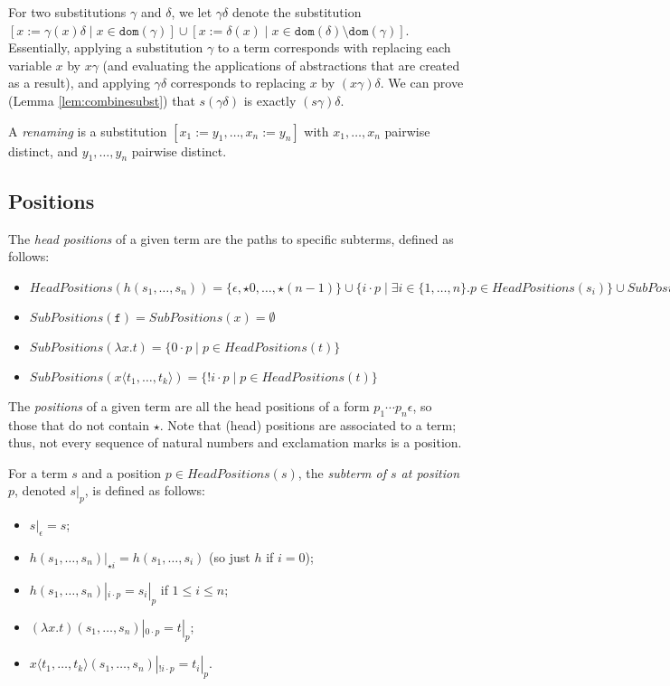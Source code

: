 \documentclass{lmcs}
\theoremstyle{theorem}\newtheorem{theorem}{Theorem}
\theoremstyle{theorem}\newtheorem{lemma}[theorem]{Lemma}
\theoremstyle{theorem}\newtheorem{corollary}[theorem]{Corollary}
\theoremstyle{definition}\newtheorem{definition}[theorem]{Definition}
\theoremstyle{definition}\newtheorem{example}[theorem]{Example}
\newcommand{\SubPositions}{\mathit{SubPositions}}
\newcommand{\HeadPositions}{\mathit{HeadPositions}}
\newcommand{\domain}{\mathtt{dom}}
\newcommand{\identifier}[1]{\mathtt{#1}}
\newcommand{\afun}{\identifier{f}}
\newcommand{\avar}{x}
\newcommand{\abs}[2]{\lambda #1.#2}
\newcommand{\meta}[2]{#1\langle#2\rangle}
\begin{document}
For two substitutions $\gamma$ and $\delta$, we let $\gamma\delta$ denote the substitution
$[\avar := \gamma(\avar)\delta \mid \avar \in \domain(\gamma)] \cup
[\avar := \delta(\avar) \mid \avar \in \domain(\delta) \setminus \domain(\gamma)]$.
Essentially, applying a substitution $\gamma$ to a term corresponds with replacing each variable
$\avar$ by $\avar\gamma$ (and evaluating the applications of abstractions that are created as a
result), and applying $\gamma\delta$ corresponds to replacing $\avar$ by $(\avar\gamma)\delta$.
We can prove (Lemma \ref{lem:combinesubst}) that $s(\gamma\delta)$ is exactly $(s\gamma)\delta$.

A \emph{renaming} is a substitution $[x_1:=y_1,\dots,x_n:=y_n]$ with $x_1,\dots,x_n$ pairwise
distinct, and $y_1,\dots,y_n$ pairwise distinct.

\subsection{Positions}

The \emph{head positions} of a given term are the paths to specific subterms, defined as follows:

\begin{itemize}
\item $\HeadPositions(h(s_1,\dots,s_n)) = \{ \epsilon, \star 0, \dots, \star (n-1) \} \cup
  \{ i \cdot p \mid \exists i \in \{1,\dots,n\}. p \in \HeadPositions(s_i) \} \cup
  \SubPositions(h)$
\item $\SubPositions(\afun) = \SubPositions(\avar) = \emptyset$
\item $\SubPositions(\abs{\avar}{t}) = \{ 0 \cdot p \mid p \in \HeadPositions(t) \}$
\item $\SubPositions(\meta{\avar}{t_1,\dots,t_k}) = \{ !i \cdot p \mid p \in
  \HeadPositions(t) \}$
\end{itemize}

The \emph{positions} of a given term are all the head positions of a form $p_1 \cdots p_n \epsilon$,
so those that do not contain $\star$.
Note that (head) positions are associated to a term; thus, not every sequence of natural numbers
and exclamation marks is a position.

For a term $s$ and a position $p \in \HeadPositions(s)$, the \emph{subterm of $s$ at position $p$},
denoted $s|_p$, is defined as follows:
\begin{itemize}
\item $s|_\epsilon = s$;
\item $h(s_1,\dots,s_n)|_{\star i} = h(s_1,\dots,s_i)$ (so just $h$ if $i = 0$);
\item $h(s_1,\dots,s_n)|_{i \cdot p} = s_i|_p$ if $1 \leq i \leq n$;
\item $(\abs{\avar}{t})(s_1,\dots,s_n)|_{0 \cdot p} = t|_p$;
\item $\meta{\avar}{t_1,\dots,t_k}(s_1,\dots,s_n)|_{!i \cdot p} = t_i|_p$.
\end{itemize}
\end{document}
